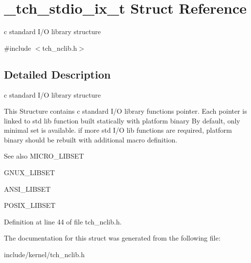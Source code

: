 \hypertarget{struct__tch__stdio__ix__t}{\section{\+\_\+tch\+\_\+stdio\+\_\+ix\+\_\+t Struct Reference}
\label{struct__tch__stdio__ix__t}
}


c standard I/\+O library structure  




{\ttfamily \#include $<$tch\+\_\+nclib.\+h$>$}



\subsection{Detailed Description}
c standard I/\+O library structure 

This Structure contains c standard I/\+O library functions pointer. Each pointer is linked to std lib function built statically with platform binary By default, only minimal set is available. if more std I/\+O lib functions are required, platform binary should be rebuilt with additional macro definition.

\begin{DoxySeeAlso}{See also}
M\+I\+C\+R\+O\+\_\+\+L\+I\+B\+S\+E\+T 

G\+N\+U\+X\+\_\+\+L\+I\+B\+S\+E\+T 

A\+N\+S\+I\+\_\+\+L\+I\+B\+S\+E\+T 

P\+O\+S\+I\+X\+\_\+\+L\+I\+B\+S\+E\+T 
\end{DoxySeeAlso}


Definition at line 44 of file tch\+\_\+nclib.\+h.



The documentation for this struct was generated from the following file\+:\begin{DoxyCompactItemize}
\item 
include/kernel/tch\+\_\+nclib.\+h\end{DoxyCompactItemize}

